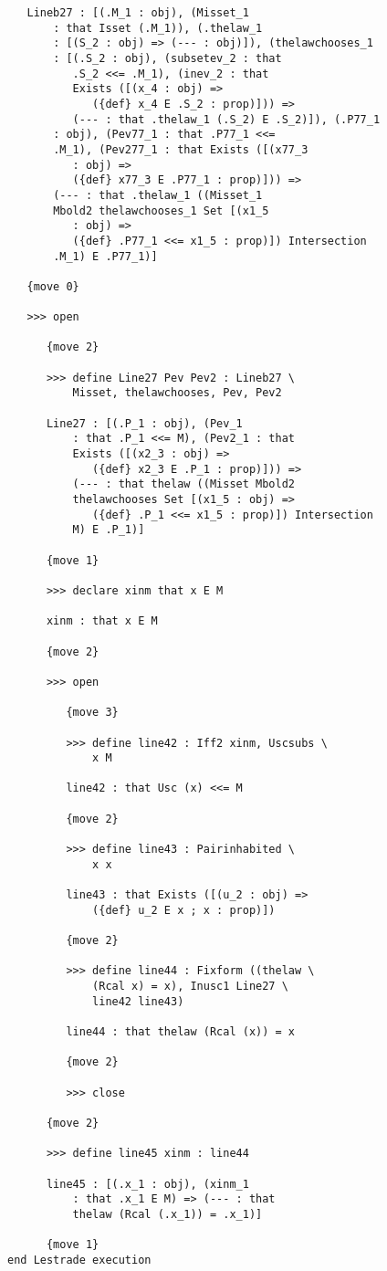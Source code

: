 \documentclass[12pt]{article}
\begin{document}
\begin{verbatim}
   Lineb27 : [(.M_1 : obj), (Misset_1 
       : that Isset (.M_1)), (.thelaw_1 
       : [(S_2 : obj) => (--- : obj)]), (thelawchooses_1 
       : [(.S_2 : obj), (subsetev_2 : that 
          .S_2 <<= .M_1), (inev_2 : that 
          Exists ([(x_4 : obj) => 
             ({def} x_4 E .S_2 : prop)])) => 
          (--- : that .thelaw_1 (.S_2) E .S_2)]), (.P77_1 
       : obj), (Pev77_1 : that .P77_1 <<= 
       .M_1), (Pev277_1 : that Exists ([(x77_3 
          : obj) => 
          ({def} x77_3 E .P77_1 : prop)])) => 
       (--- : that .thelaw_1 ((Misset_1 
       Mbold2 thelawchooses_1 Set [(x1_5 
          : obj) => 
          ({def} .P77_1 <<= x1_5 : prop)]) Intersection 
       .M_1) E .P77_1)]

   {move 0}

   >>> open

      {move 2}

      >>> define Line27 Pev Pev2 : Lineb27 \
          Misset, thelawchooses, Pev, Pev2

      Line27 : [(.P_1 : obj), (Pev_1 
          : that .P_1 <<= M), (Pev2_1 : that 
          Exists ([(x2_3 : obj) => 
             ({def} x2_3 E .P_1 : prop)])) => 
          (--- : that thelaw ((Misset Mbold2 
          thelawchooses Set [(x1_5 : obj) => 
             ({def} .P_1 <<= x1_5 : prop)]) Intersection 
          M) E .P_1)]

      {move 1}

      >>> declare xinm that x E M

      xinm : that x E M

      {move 2}

      >>> open

         {move 3}

         >>> define line42 : Iff2 xinm, Uscsubs \
             x M

         line42 : that Usc (x) <<= M

         {move 2}

         >>> define line43 : Pairinhabited \
             x x

         line43 : that Exists ([(u_2 : obj) => 
             ({def} u_2 E x ; x : prop)])

         {move 2}

         >>> define line44 : Fixform ((thelaw \
             (Rcal x) = x), Inusc1 Line27 \
             line42 line43)

         line44 : that thelaw (Rcal (x)) = x

         {move 2}

         >>> close

      {move 2}

      >>> define line45 xinm : line44

      line45 : [(.x_1 : obj), (xinm_1 
          : that .x_1 E M) => (--- : that 
          thelaw (Rcal (.x_1)) = .x_1)]

      {move 1}
end Lestrade execution
\end{verbatim}
\end{document}
